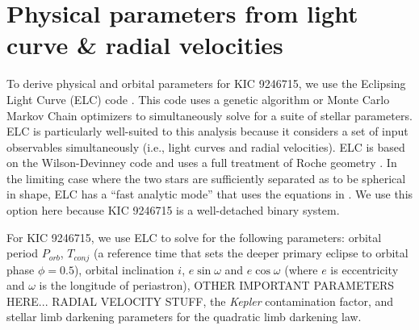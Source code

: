 \section{Physical parameters from light curve \& radial velocities}\label{model}
To derive physical and orbital parameters for KIC 9246715, we use the Eclipsing Light Curve (ELC) code \citep{oro00}. This code uses a genetic algorithm or Monte Carlo Markov Chain optimizers to simultaneously solve for a suite of stellar parameters. ELC is particularly well-suited to this analysis because it considers a set of input observables simultaneously (i.e., light curves and radial velocities). ELC is based on the Wilson-Devinney code \citep{wil71} and uses a full treatment of Roche geometry \citep{avn75}. In the limiting case where the two stars are sufficiently separated as to be spherical in shape, ELC has a ``fast analytic mode'' that uses the equations in \citep{gim06}. We use this option here because KIC 9246715 is a well-detached binary system.

For KIC 9246715, we use ELC to solve for the following parameters: orbital period $P_{orb}$, $T_{conj}$ (a reference time that sets the deeper primary eclipse to orbital phase $\phi = 0.5$), orbital inclination $i$, $e \sin \omega$ and $e \cos \omega$ (where $e$ is eccentricity and $\omega$ is the longitude of periastron), OTHER IMPORTANT PARAMETERS HERE... RADIAL VELOCITY STUFF, the \emph{Kepler} contamination factor, and stellar limb darkening parameters for the quadratic limb darkening law.


%
